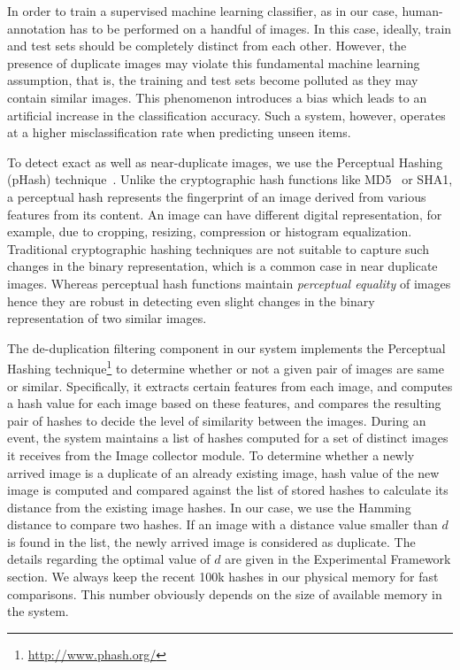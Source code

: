 \documentclass{iscram}
\begin{document}
In order to train a supervised machine learning classifier, as in our case, human-annotation has to be performed on a handful of images. In this case, ideally, train and test sets should be completely distinct from each other. However, the presence of duplicate images may violate this fundamental machine learning assumption, that is, the training and test sets become polluted as they may contain similar images. This phenomenon introduces a bias which leads to an artificial increase in the classification accuracy. Such a system, however, operates at a higher misclassification rate when predicting unseen items.


To detect exact as well as near-duplicate images, we use the Perceptual Hashing (pHash) technique~\parencite{lei2011robust, zauner2010implementation}. Unlike the cryptographic hash functions like MD5~\parencite{rivest1992md5} or SHA1, a perceptual hash represents the fingerprint of an image derived from various features from its content. An image can have different digital representation, for example, due to cropping, resizing, compression or histogram equalization. Traditional cryptographic hashing techniques are not suitable to capture such changes in the binary representation, which is a common case in near duplicate images. Whereas perceptual hash functions maintain \emph{perceptual equality} of images hence they are robust in detecting even slight changes in the binary representation of two similar images.

The de-duplication filtering component in our system implements the Perceptual Hashing technique\footnote{\url{http://www.phash.org/}} to determine whether or not a given pair of images are same or similar. Specifically, it extracts certain features from each image, and computes a hash value for each image based on these features, and compares the resulting pair of hashes to decide the level of similarity between the images. During an event, the system maintains a list of hashes computed for a set of distinct images it receives from the Image collector module. To determine whether a newly arrived image is a duplicate of an already existing image, hash value of the new image is computed and compared against the list of stored hashes to calculate its distance from the existing image hashes. In our case, we use the Hamming distance to compare two hashes. If an image with a distance value smaller than $d$ is found in the list, the newly arrived image is considered as duplicate. The details regarding the optimal value of $d$ are given in the Experimental Framework section. We always keep the recent 100k hashes in our physical memory for fast comparisons. This number obviously depends on the size of available memory in the system.
\end{document}
